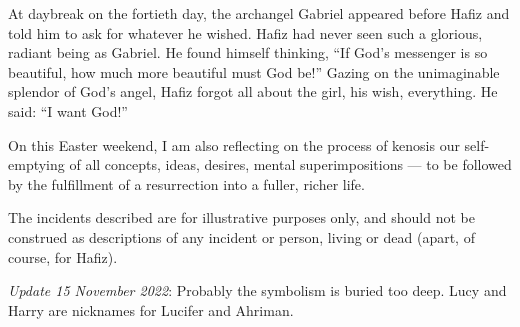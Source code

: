At daybreak on the fortieth day, the archangel Gabriel appeared before Hafiz and told him to ask for whatever he wished. Hafiz had never seen such a glorious, radiant being as Gabriel. He found himself thinking, “If God’s messenger is so beautiful, how much more beautiful must God be!” Gazing on the unimaginable splendor of God’s angel, Hafiz forgot all about the girl, his wish, everything. He said: “I want God!”

On this Easter weekend, I am also reflecting on the process of kenosis our self-emptying of all concepts, ideas, desires, mental superimpositions — to be followed by the fulfillment of a resurrection into a fuller, richer life.

\hfill

The incidents described are for illustrative purposes only, and should not be construed as descriptions of any incident or person, living or dead (apart, of course, for Hafiz).

\textit{Update 15 November 2022}: Probably the symbolism is buried too deep. Lucy and Harry are nicknames for Lucifer and Ahriman.


